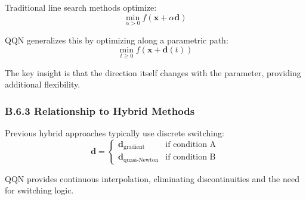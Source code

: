 Traditional line search methods optimize:
\[\min_{\alpha > 0} f(\mathbf{x} + \alpha \mathbf{d})\]

QQN generalizes this by optimizing along a parametric path:
\[\min_{t \geq 0} f(\mathbf{x} + \mathbf{d}(t))\]

The key insight is that the direction itself changes with the parameter, providing additional flexibility.

\hypertarget{b.6.3-relationship-to-hybrid-methods}{%
\subsubsection{B.6.3 Relationship to Hybrid Methods}\label{b.6.3-relationship-to-hybrid-methods}}

Previous hybrid approaches typically use discrete switching:
\[\mathbf{d} = \begin{cases}
\mathbf{d}_{\text{gradient}} & \text{if condition A} \\
\mathbf{d}_{\text{quasi-Newton}} & \text{if condition B}
\end{cases}\]

QQN provides continuous interpolation, eliminating discontinuities and the need for switching logic.
